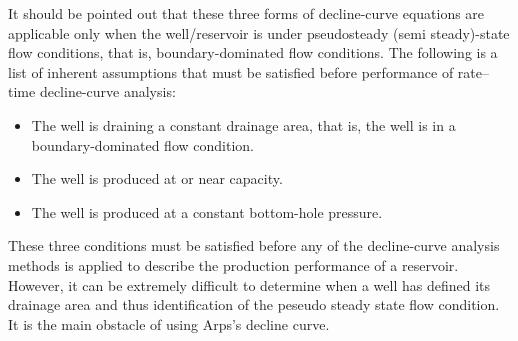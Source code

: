 \documentclass[12pt,a4paper]{report}
\begin{document}
It should be pointed out that these three forms of decline-curve equations are applicable only when the well/reservoir is under pseudosteady (semi steady)-state flow conditions, that is, boundary-dominated flow conditions. The following is a list of inherent assumptions that must be satisfied before performance of rate–time decline-curve analysis:
\begin{itemize}
	\item The well is draining a constant drainage area, that is, the well is in a boundary-dominated flow condition.
	\item The well is produced at or near capacity.
	\item The well is produced at a constant bottom-hole pressure.
\end{itemize}
These three conditions must be satisfied before any of the decline-curve analysis methods is applied to describe the production performance of a reservoir. However, it can be extremely difficult to determine when a well has defined its drainage area and thus identification of the peseudo steady state flow condition. It is the main obstacle of using Arps's decline curve. 
\end{document}
